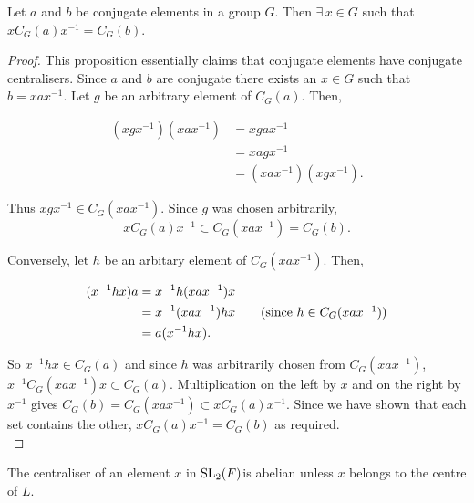 \begin{proposition} \label{conjcent} Let $a$ and $b$ be conjugate elements in a group $G$. Then $\exists \, x \in G$ such that $xC_G(a)x^{-1} = C_G(b)$. \vspace{3mm}
\end{proposition}

\begin{proof}
This proposition essentially claims that conjugate elements have conjugate centralisers. Since $a$ and $b$ are conjugate there exists an $x \! \in \! G$ such that $b = xax^{-1}$. Let $g$ be an arbitrary element of $C_G(a)$. Then,

\begin{align*} (xgx^{-1})(xax^{-1}) &= xgax^{-1} \\
&= xagx^{-1} \tag{since $g \in C_G(a)$} \\
&= (xax^{-1})(xgx^{-1}). \end{align*}

Thus $xgx^{-1} \in C_G(xax^{-1})$. Since $g$ was chosen arbitrarily, $$xC_G(a)x^{-1} \subset C_G(xax^{-1}) = C_G(b).$$ 

Conversely, let $h$ be an arbitary element of $C_G(xax^{-1})$. Then,

\begin{align*} (x^{-1}hx)a &= x^{-1}h(xax^{-1})x \\
&= x^{-1}(xax^{-1})hx \tag{since $h \in C_G(xax^{-1})$} \\
&= a(x^{-1}hx). \end{align*}

So $x^{-1}hx \in C_G(a)$ and since $h$ was arbitrarily chosen from $C_G(xax^{-1})$, \linebreak $x^{-1}C_G(xax^{-1})x \subset C_G(a)$. Multiplication on the left by $x$ and on the right by $x^{-1}$ gives $C_G(b) =  C_G(xax^{-1}) \subset xC_G(a)x^{-1}$. Since we have shown that each set contains the other, $xC_G(a)x^{-1} = C_G(b)$ as required. \\
\end{proof}

\begin{corollary}\label{6.5}
The centraliser of an element $x$ in $\operatorname{SL}_2(F)$is abelian unless $x$ belongs to the centre of $L$. \vspace{3mm}
\end{corollary}

